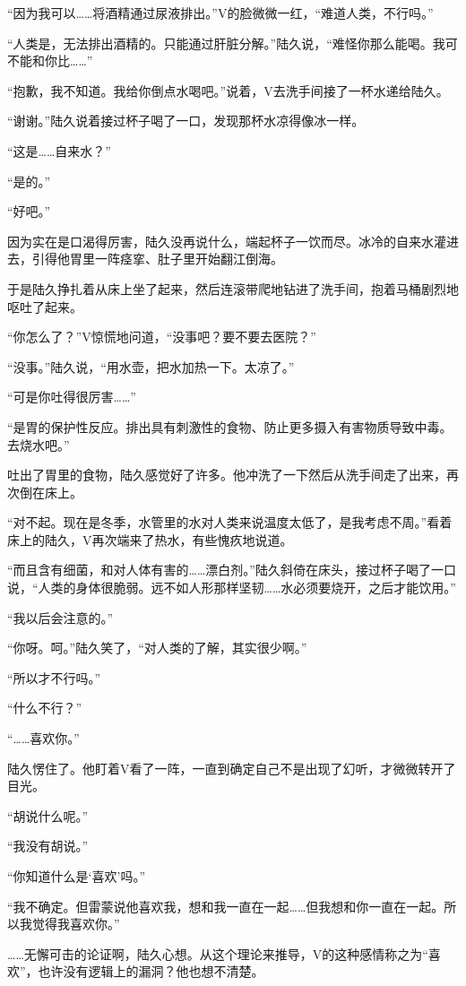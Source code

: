 “因为我可以……将酒精通过尿液排出。”V的脸微微一红，“难道人类，不行吗。”

“人类是，无法排出酒精的。只能通过肝脏分解。”陆久说，“难怪你那么能喝。我可不能和你比……”

“抱歉，我不知道。我给你倒点水喝吧。”说着，V去洗手间接了一杯水递给陆久。

“谢谢。”陆久说着接过杯子喝了一口，发现那杯水凉得像冰一样。

“这是……自来水？”

“是的。”

“好吧。”

因为实在是口渴得厉害，陆久没再说什么，端起杯子一饮而尽。冰冷的自来水灌进去，引得他胃里一阵痉挛、肚子里开始翻江倒海。

于是陆久挣扎着从床上坐了起来，然后连滚带爬地钻进了洗手间，抱着马桶剧烈地呕吐了起来。

“你怎么了？”V惊慌地问道，“没事吧？要不要去医院？”

“没事。”陆久说，“用水壶，把水加热一下。太凉了。”

“可是你吐得很厉害……”

“是胃的保护性反应。排出具有刺激性的食物、防止更多摄入有害物质导致中毒。去烧水吧。”

吐出了胃里的食物，陆久感觉好了许多。他冲洗了一下然后从洗手间走了出来，再次倒在床上。

“对不起。现在是冬季，水管里的水对人类来说温度太低了，是我考虑不周。”看着床上的陆久，V再次端来了热水，有些愧疚地说道。

“而且含有细菌，和对人体有害的……漂白剂。”陆久斜倚在床头，接过杯子喝了一口说，“人类的身体很脆弱。远不如人形那样坚韧……水必须要烧开，之后才能饮用。”

“我以后会注意的。”

“你呀。呵。”陆久笑了，“对人类的了解，其实很少啊。”

“所以才不行吗。”

“什么不行？”

“……喜欢你。”

陆久愣住了。他盯着V看了一阵，一直到确定自己不是出现了幻听，才微微转开了目光。

“胡说什么呢。”

“我没有胡说。”

“你知道什么是‘喜欢’吗。”

“我不确定。但雷蒙说他喜欢我，想和我一直在一起……但我想和你一直在一起。所以我觉得我喜欢你。”

……无懈可击的论证啊，陆久心想。从这个理论来推导，V的这种感情称之为“喜欢”，也许没有逻辑上的漏洞？他也想不清楚。

